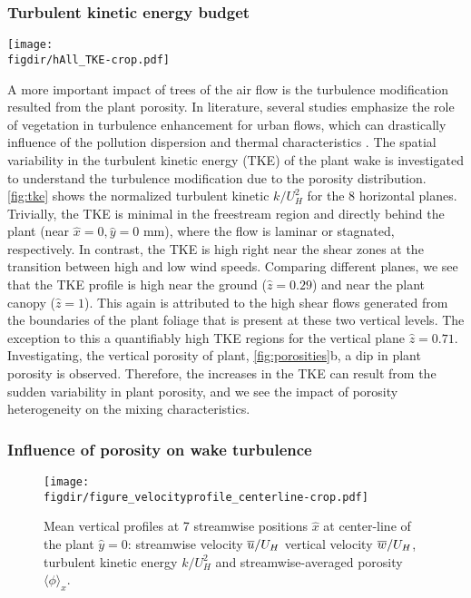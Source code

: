 \subsubsection*{Turbulent kinetic energy budget}
		
	\begin{sidewaysfigure}[p]
		\centering
		\texttt{[image: \\figdir/hAll\_TKE-crop.pdf]}
		\caption{Normalized turbulent kinetic energy $k/U_H^2$ at 8 horizontal planes, $\hat{z}=$ [$0.29$,~$0.43$,~$0.57$, $0.71$, $0.86$, $1.0$, $1.14$, $1.29]$.}
		\label{fig:tke}
	\end{sidewaysfigure}


A more important impact of trees of the air flow is the turbulence modification resulted from the plant porosity. In literature, several studies emphasize the role of vegetation in turbulence enhancement for urban flows, which can drastically influence of the pollution dispersion and thermal characteristics \citep{Amorim2013,Gromke2008,Poggi2004}. The spatial variability in the turbulent kinetic energy (TKE) of the plant wake is investigated to understand the turbulence modification due to the porosity distribution. \cref{fig:tke} shows the normalized turbulent kinetic $k/U_H^2$ for the 8 horizontal planes. Trivially, the TKE is minimal in the freestream region and directly behind the plant (near  $\hat{x}= 0, \hat{y} = 0$ mm), where the flow is laminar or stagnated, respectively. In contrast, the TKE is high right near the shear zones at the transition between high and low wind speeds. Comparing different planes, we see that the TKE profile is high near the ground ($\hat{z}=0.29$) and near the plant canopy ($\hat{z}=1$). This again is attributed to the high shear flows generated from the boundaries of the plant foliage that is present at these two vertical levels. The exception to this a quantifiably high TKE regions for the vertical plane $\hat{z}=0.71$. Investigating, the vertical porosity of plant, \cref{fig:porosities}b, a dip in plant porosity is observed. Therefore, the increases in the TKE can result from the sudden variability in plant porosity, and we see the impact of porosity heterogeneity on the mixing characteristics.

\subsubsection*{Influence of porosity on wake turbulence}
	
	\begin{figure}[t]
		\centering
		\texttt{[image: \\figdir/figure\_velocityprofile\_centerline-crop.pdf]}
		\caption{Mean vertical profiles at 7 streamwise positions $\hat{x}$ at center-line of the plant $\hat{y} = 0$:  streamwise velocity $\overline{u}/U_H$  vertical velocity $\overline{w}/U_H$,   turbulent kinetic energy $k/U_H^2$ and  streamwise-averaged porosity $\langle \phi \rangle_x$.}
		\label{fig:verticalprofile}
	\end{figure}

